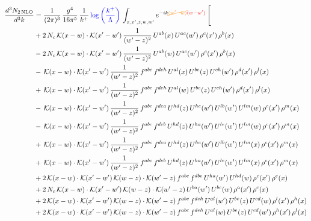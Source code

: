 \documentclass[9pt]{article}
\numberwithin{equation}{section}
\begin{document}
\begin{align}
\frac{d^{3}N_{2\,\mathrm{NLO}}}{d^{3}k} & = \frac{1}{(2\pi)^{3}}\,\frac{g^{4}}{16\pi^{5}}\,\frac{1}{k^{+}}\,{\color{blue}\log{\left(\frac{k^{+}}{\Lambda}\right)}}\,\int_{x,x',z,w,w'}e^{-ik{\color{orange}\cancel{(w'-w)}}{\color{red}(w-w')}}\,\Bigg[
\notag \\ &+2\,N_{c}\,\mathcal{K}(x-w)\cdot\mathcal{K}(x'-w')\,\frac{1}{(w'-z)^{2}}\,U^{ab}(x)\,U^{ac}(w')\,\rho^{c}(x')\,\rho^{b}(x)\notag\\
&-2\,N_{c}\,\mathcal{K}(x-w)\cdot\mathcal{K}(x'-w')\,\frac{1}{(w'-z)^{2}}\,U^{ab}(w)\,U^{ac}(w')\,\rho^{c}(x')\,\rho^{b}(x)\notag\\
&-\,\mathcal{K}(x-w)\cdot\mathcal{K}(x'-w')\,\frac{1}{(w'-z)^{2}}\,f^{abc}\,f^{deh}\,U^{al}(x)\,U^{be}(z)\,U^{ch}(w')\,\rho^{d}(x')\,\rho^{l}(x)\notag\\
&+\,\mathcal{K}(x-w)\cdot\mathcal{K}(x'-w')\,\frac{1}{(w'-z)^{2}}\,f^{abc}\,f^{deh}\,U^{al}(w)\,U^{be}(z)\,U^{ch}(w')\,\rho^{d}(x')\,\rho^{l}(x)\notag \\ & -\,\mathcal{K}(x-w)\cdot\mathcal{K}(x'-w')\,\frac{1}{(w'-z)^{2}}\,f^{abc}\,f^{dea}\,U^{hd}(z)\,U^{he}(w')\,U^{lb}(w')\,U^{lm}(w)\,\rho^{c}(x')\,\rho^{m}(x)\notag\\
&-\,\mathcal{K}(x-w)\cdot\mathcal{K}(x'-w')\,\frac{1}{(w'-z)^{2}}\,f^{abc}\,f^{deb}\,U^{hd}(z)\,U^{ha}(w')\,U^{le}(w')\,U^{lm}(w)\,\rho^{c}(x')\,\rho^{m}(x)\notag\\
&+\,\mathcal{K}(x-w)\cdot\mathcal{K}(x'-w')\,\frac{1}{(w'-z)^{2}}\,f^{abc}\,f^{dea}\,U^{hd}(z)\,U^{he}(w')\,U^{lb}(w')\,U^{lm}(x)\,\rho^{c}(x')\,\rho^{m}(x)\notag\\
&+\,\mathcal{K}(x-w)\cdot\mathcal{K}(x'-w')\,\frac{1}{(w'-z)^{2}}\,f^{abc}\,f^{deb}\,U^{hd}(z)\,U^{ha}(w')\,U^{le}(w')\,U^{lm}(x)\,\rho^{c}(x')\,\rho^{m}(x)\notag\\
&+2\,\mathcal{K}(x-w)\cdot\mathcal{K}(x'-w')\,\mathcal{K}(w-z)\cdot\mathcal{K}(w'-z)\,f^{abc}\,f^{dbe}\,U^{ha}(w')\,U^{hd}(w)\,\rho^{c}(x')\,\rho^{e}(x)\notag\\
&+2\,N_{c}\,\mathcal{K}(x-w)\cdot\mathcal{K}(x'-w')\,\mathcal{K}(w-z)\cdot\mathcal{K}(w'-z)\,U^{ba}(w')\,U^{bc}(w)\,\rho^{a}(x')\,\rho^{c}(x)\notag \\ & +2\,\mathcal{K}(x-w)\cdot\mathcal{K}(x'-w')\,\mathcal{K}(w-z)\cdot\mathcal{K}(w'-z)\,f^{abc}\,f^{deh}\,U^{al}(w')\,U^{be}(z)\,U^{cd}(w)\,\rho^{l}(x')\,\rho^{h}(x)\notag\\
&+2\,\mathcal{K}(x-w)\cdot\mathcal{K}(x'-w')\,\mathcal{K}(w-z)\cdot\mathcal{K}(w'-z)\,f^{abc}\,f^{deh}\,U^{al}(w)\,U^{be}(z)\,U^{cd}(w')\,\rho^{h}(x')\,\rho^{l}(x)\notag\\

\end{align}
\end{document}
